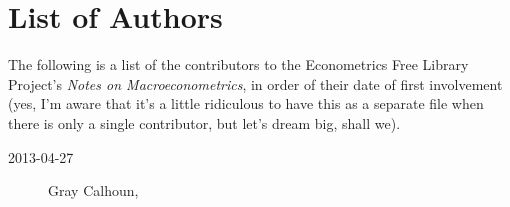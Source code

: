 

\part*{List of Authors}%

The following is a list of the contributors to the Econometrics Free
Library Project's \textit{Notes on Macroeconometrics}, in order of
their date of first involvement (yes, I'm aware that it's a little
ridiculous to have this as a separate file when there is only a single
contributor, but let's dream big, shall we).

\begin{description}
\item[2013-04-27] Gray Calhoun, 
\end{description}

